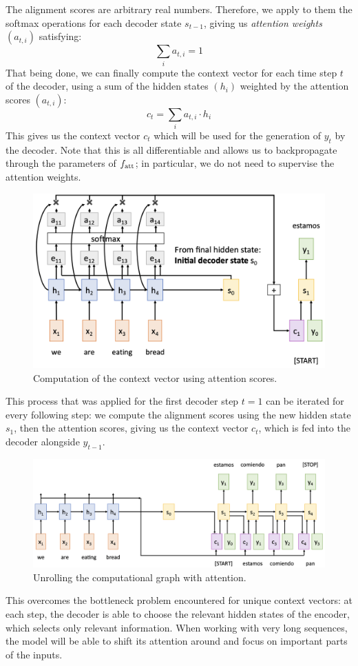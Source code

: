 The alignment scores are arbitrary real numbers. Therefore, we apply to them the softmax operations for each decoder state $s_{t-1}$, giving us \emph{attention weights} $(a_{t,i})$ satisfying:
\begin{equation*}
    \sum_i a_{t,i} = 1 
\end{equation*}
That being done, we can finally compute the context vector for each time step $t$ of the decoder, using a sum of the hidden states $(h_i)$ weighted by the attention scores $(a_{t,i})$:
\begin{equation*}
    c_t = \sum_i a_{t,i}\cdot h_i
\end{equation*}
This gives us the context vector $c_t$ which will be used for the generation of $y_t$ by the decoder. Note that this is all differentiable and allows us to backpropagate through the parameters of $f_{\textnormal{att}}$; in particular, we do not need to supervise the attention weights.
\begin{figure}[H]
    \centering
    \includegraphics[width=.65\textwidth]{images/attention-context.png}
    \caption{Computation of the context vector using attention scores.}
\end{figure}
This process that was applied for the first decoder step $t=1$ can be iterated for every following step: we compute the alignment scores using the new hidden state $s_1$, then the attention scores, giving us the context vector $c_t$, which is fed into the decoder alongside $y_{t-1}$.
\begin{figure}[H]
    \centering
    \includegraphics[width=.9\textwidth]{images/attention-unrolled.png}
    \caption{Unrolling the computational graph with attention.}
\end{figure}
This overcomes the bottleneck problem encountered for unique context vectors: at each step, the decoder is able to choose the relevant hidden states of the encoder, which selects only relevant information. When working with very long sequences, the model will be able to shift its attention around and focus on important parts of the inputs.

